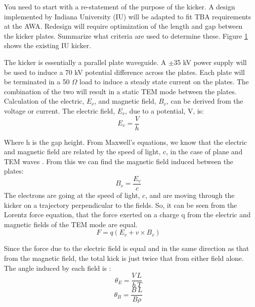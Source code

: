 \documentclass{iitthesis}
\newcommand{\lsnote}[1]{\textsf{{\color{violet}{ LS note:}   #1 }}}
\begin{document}
\lsnote{You need to start with a re-statement of the purpose of the kicker. }
A design implemented by Indiana University (IU) \cite{iukicker}
will be adapted to fit TBA requirements at the AWA. Redesign will require optimization
of the length and gap between the kicker plates. \lsnote{Summarize what criteria are used to determine these.} Figure \ref{fig:IUkicker} shows the existing IU kicker.
\begin{figure}[h]
	\begin{center}
		\label{fig:IUkicker}
	\end{center}
\end{figure}
The kicker is essentially a parallel plate waveguide. 
A $\pm$35 kV power supply will be used to induce a 70 kV potential difference 
across the plates. Each plate will be terminated in a 50 $\Omega$ load to induce a steady 
state current on the plates. The combination of the two will result in a static TEM mode 
between the plates. Calculation of the electric, $E_v$, and magnetic field, $B_v$,
can be derived from the voltage or current. The electric field, $E_v$, due to a potential, V, is: 
\begin{equation}
E_v=\frac{V}{h}
\end{equation}

Where h is the gap height. From Maxwell's equations, we know that the electric and magnetic 
field are related by the speed of light, c, in the case of plane and TEM waves \cite{pozar}. 
From this we can find the magnetic field induced between the plates: 
\begin{equation}
B_v=\frac{E_v}{c}
\end{equation}
The electrons are going at the speed of light, $c$, and are moving through the kicker on a 
trajectory perpendicular to the fields.  So, it can be seen from the Lorentz force equation, that the force 
exerted on a charge q from the electric and magnetic fields of the TEM mode are equal. 
\begin{equation}
F=q(E_v+v\times B_v)
\end{equation}

Since the force due to the electric field is equal and in the same direction as that from the magnetic field, 
the total kick is just twice that from either field alone.  The angle induced by each field is \cite{iukicker, Wiedemann}:  
\begin{equation}
\theta_E= \frac{V\,L}{h\,T}
\end{equation}
\begin{equation}
\theta_B= \frac{B\,L}{B\rho}
\end{equation}
\end{document}
